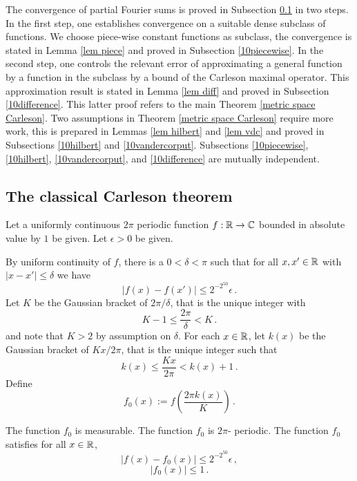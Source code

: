 {The convergence of partial Fourier sums is proved in
Subsection \ref{10classical} in two steps. In the first step,
one establishes convergence on a suitable dense subclass of functions. We choose piece-wise constant functions as subclass, the convergence is stated in Lemma \ref{lem piece} and proved in Subsection \ref{10piecewise}.
In the second step, one controls the relevant error of approximating a general function by a function in
the subclass by a bound of the Carleson maximal operator. This approximation result is stated
in Lemma \ref{lem diff} and proved in Subsection \ref{10difference}.
This latter proof refers to the main Theorem \ref{metric space Carleson}. Two assumptions in Theorem \ref{metric space Carleson} require more work, this is prepared in Lemmas \ref{lem hilbert} and \ref{lem vdc} and proved in Subsections \ref{10hilbert}
and \ref{10vandercorput}. Subsections \ref{10piecewise},
\ref{10hilbert}, \ref{10vandercorput}, and \ref{10difference}
are mutually independent.


\subsection{The classical Carleson theorem}
\label{10classical}

Let a uniformly continuous $2\pi$ periodic function $f:\mathbb{R}\to \mathbb{C}$ bounded in absolute value by $1$ be given. Let $\epsilon>0$ be given.

By uniform  continuity of $f$, there is a $0<\delta<\pi$
such that for all $x,x' \in \mathbb{R}$ with $|x-x'|\le \delta$
we have
\begin{equation}\label{uniconbound}
|f(x)-f(x')|\le 2^{-2^{50}}\epsilon\, .
\end{equation}
Let $K$ be the Gaussian bracket of $2\pi/\delta$, that is the unique integer with
\begin{equation}
    K-1\le  \frac{2\pi}{\delta} < K\, .
\end{equation}
and note that $K>2$ by assumption on $\delta$.
For each $x\in \mathbb{R}$, let $k(x)$ be the Gaussian bracket of $Kx/2\pi$, that is the unique integer such that
\begin{equation}\label{definekx}
k(x)\le \frac{Kx}{2\pi}<k(x)+1\, .
\end{equation}
Define
\begin{equation}\label{def fzero}
f_0(x):=f\left(\frac{2\pi k(x)}{K}\right)\, .
\end{equation}
\begin{lemma}
The function $f_0$ is measurable.
The function $f_0$ is $2\pi $- periodic.
The function $f_0$ satisfies  for all $x\in \mathbb{R}$,
\begin{equation}\label{eq ffzero}
|f(x)-f_0(x)|\le  2^{-2^{50}} \epsilon\, ,
\end{equation}
\begin{equation}\label{eq ffzero1}
|f_0(x)|\le  1\, .
\end{equation}
\end{lemma}

}
